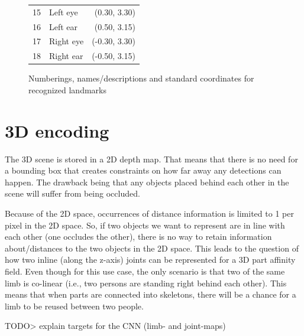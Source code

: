 \begin{figure}[h]
\begin{floatrow}
{\begin{tabular}[H]{|r l r|}
        15 & Left eye & (0.30, 3.30) \\
        16 & Left ear & (0.50, 3.15) \\
        17 & Right eye & (-0.30, 3.30) \\
        18 & Right ear & (-0.50, 3.15) \\
        \hline
      \end{tabular}
    }{
      \caption[Names/coordinates for detected landmarks]{Numberings, names/descriptions and standard coordinates for recognized landmarks}
      \label{tab:openpose_body_ids}
    }
  \end{floatrow}          
\end{figure}


\section{3D encoding}
The 3D scene is stored in a 2D depth map. That means that there is no need for a bounding box that creates constraints on how far away any detections can happen. The drawback being that any objects placed behind each other in the scene will suffer from being occluded.

Because of the 2D space, occurrences of distance information is limited to 1 per pixel in the 2D space. So, if two objects we want to represent are in line with each other (one occludes the other), there is no way to retain information about/distances to the two objects in the 2D space.
This leads to the question of how two inline (along the z-axis) joints can be represented for a 3D part affinity field. Even though for this use case, the only scenario is that two of the same limb is co-linear (i.e., two persons are standing right behind each other). This means that when parts are connected into skeletons, there will be a chance for a limb to be reused between two people.


TODO> explain targets for the CNN (limb- and joint-maps)







